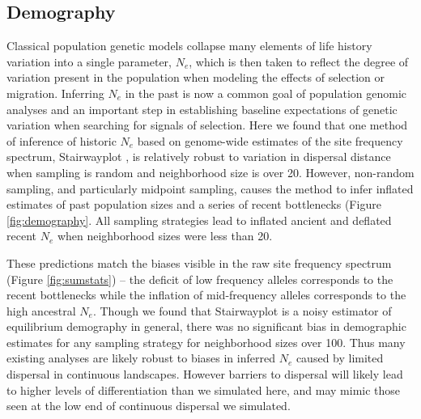 \documentclass[11pt,twoside,lineno]{preprint}
\newif\ifcomments
\newcommand{\cjb}[1]{\ifcomments{{\color{orange} \it (#1)}}\else{}\fi}
\newcommand{\ak}[1]{\ifcomments{{\color{red} \it (#1)}}\else{}\fi}
\begin{document}
\subsection{Demography}
Classical population genetic models collapse many elements of life history variation into a single parameter, $N_{e}$, which is then taken to reflect the degree of variation present in the population when modeling the effects of selection or migration. Inferring $N_{e}$ in the past is now a common goal of population genomic analyses and an important step in establishing baseline expectations of genetic variation when searching for signals of selection. Here we found that one method of inference of historic $N_{e}$ based on genome-wide estimates of the site frequency spectrum, Stairwayplot \citep{Liu2015}, is relatively robust to variation in dispersal distance when sampling is random and neighborhood size is over 20. However, non-random sampling, and particularly midpoint sampling, causes the method to infer inflated estimates of past population sizes and a series of recent bottlenecks (Figure \ref{fig:demography}. All sampling strategies lead to inflated ancient and deflated recent $N_{e}$ when neighborhood sizes were less than 20.

These predictions match the biases visible in the raw site frequency spectrum (Figure \ref{fig:sumstats}) -- the deficit of low frequency alleles corresponds to the recent bottlenecks while the inflation of mid-frequency alleles corresponds to the high ancestral $N_{e}$. Though we found that Stairwayplot is a noisy estimator of equilibrium demography in general, there was no significant bias in demographic estimates for any sampling strategy for neighborhood sizes over 100. Thus many existing analyses are likely robust to biases in inferred $N_{e}$ caused by limited dispersal in continuous landscapes. However  barriers to dispersal will likely lead to higher levels of differentiation than we simulated here, and may mimic those seen at the low end of continuous dispersal we simulated.  

\cjb{could be another paragraph here discussing the relationship between Ne, the distribution of coalescence times, and dispersal.}
\ak{wonder if it is worth revisting MSMC or similar now that we know more about how to run the method?}
\end{document}
